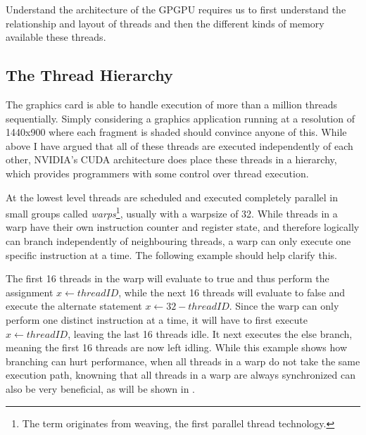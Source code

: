Understand the architecture of the GPGPU requires us to first
understand the relationship and layout of threads and then the
different kinds of memory available these threads.


\subsection{The Thread Hierarchy}


The graphics card is able to handle execution of more than a million
threads sequentially. Simply considering a graphics application
running at a resolution of 1440x900 where each fragment is shaded
should convince anyone of this. While above I have argued that all of
these threads are executed independently of each other, NVIDIA's CUDA
architecture does place these threads in a hierarchy, which provides
programmers with some control over thread execution.


At the lowest level threads are scheduled and executed completely
parallel in small groups called \textit{warps}\footnote{The term
  originates from weaving, the first parallel thread
  technology.}, usually with a warpsize of 32. While
threads in a warp have their own instruction counter and register
state, and therefore logically can branch independently of
neighbouring threads, a warp can only execute one specific instruction
at a time. The following example should help clarify this.

\begin{algorithmic}
  \ELSE
  \ENDIF
\end{algorithmic}


The first 16 threads in the warp will evaluate to true and thus
perform the assignment $x \leftarrow threadID$, while the next 16
threads will evaluate to false and execute the alternate statement $x
\leftarrow 32 - threadID$. Since the warp can only perform one
distinct instruction at a time, it will have to first execute $x
\leftarrow threadID$, leaving the last 16 threads idle. It next
executes the else branch, meaning the first 16 threads are now left
idling. While this example shows how branching can hurt performance,
when all threads in a warp do not take the same execution path,
knowning that all threads in a warp are always synchronized can also
be very beneficial, as will be shown in
.

